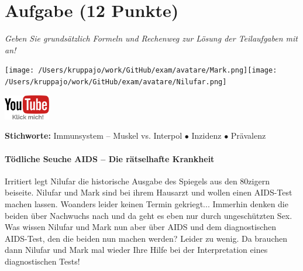 \documentclass[a4paper, 9pt]{scrartcl}\usepackage[]{graphicx}\usepackage[]{xcolor}
\begin{document}
 
\clearpage

\section{Aufgabe \hfill (12 Punkte)}

\textit{Geben Sie grundsätzlich Formeln und Rechenweg zur Lösung der Teilaufgaben mit an!} \\[1Ex]
 

 
\ifcollection
\begin{flushright}
\tiny\vspace{-3Ex}
\textbf{\examinhaltstart}
\exammodulemathstat
\vspace{-4Ex}
\end{flushright}
\begin{minipage}[t]{0.5\textwidth}
\texttt{[image: /Users/kruppajo/work/GitHub/exam/avatare/Mark.png]}\hspace{-4mm}\texttt{[image: /Users/kruppajo/work/GitHub/exam/avatare/Nilufar.png]}
\end{minipage}
\begin{minipage}[t]{0.5\textwidth}
\hfill
\href{https://youtu.be/flRBo1FWQy0}{\includegraphics[width = 2cm]{img/youtube}}
\end{minipage}
\fi

{\tiny\textbf{Stichworte:} Immunsystem -- Muskel vs. Interpol $\bullet$ Inzidenz $\bullet$ Prävalenz}




\ifcollection
\paragraph{Tödliche Seuche AIDS -- Die rätselhafte Krankheit}
\fi



Irritiert legt Nilufar die historische Ausgabe des Spiegels aus den 80zigern beiseite. Nilufar und Mark sind bei ihrem Hausarzt und wollen einen AIDS-Test machen lassen. Woanders leider keinen Termin gekriegt... Immerhin denken die beiden über Nachwuchs nach und da geht es eben nur durch ungeschützten Sex. Was wissen Nilufar und Mark nun aber über AIDS und dem diagnostischen AIDS-Test, den die beiden nun machen werden? Leider zu wenig. Da brauchen dann Nilufar und Mark mal wieder Ihre Hilfe bei der Interpretation eines diagnostischen Tests!\\
\end{document}
